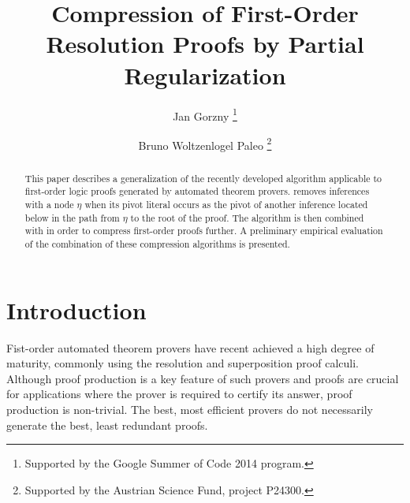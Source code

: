 \documentclass{llncs}
\title{Compression of First-Order Resolution Proofs by Partial Regularization} %
\author{
  Jan Gorzny\inst{1}
  \thanks{Supported by the Google Summer of Code 2014 program.}
  \and 
  Bruno Woltzenlogel Paleo\inst{2}
  \thanks{Supported by the Austrian Science Fund, project P24300.}
}
\institute{
  \email{jgorzny@uvic.ca}, University of Victoria, Canada
  \and 
  \email{bruno@logic.at}, Vienna University of Technology, Austria
}
\begin{document}
\maketitle


\begin{abstract}%
This paper describes a generalization of the recently developed \RecyclePivotsIntersection algorithm applicable to first-order logic proofs generated by automated theorem provers. \RecyclePivotsIntersection removes inferences with a node $\eta$ when its pivot literal occurs as the pivot of another inference located below in the path from $\eta$ to the root of the proof. The algorithm is then combined with \SFOLowerUnits in order to compress first-order proofs further. A preliminary empirical evaluation of the combination of these compression algorithms is presented.
\end{abstract}


\setcounter{footnote}{0}

\section{Introduction}

Fist-order automated theorem provers have recent achieved a high degree of maturity, commonly using the resolution and superposition proof calculi. Although proof production is a key feature of such provers and proofs are crucial for applications where the prover is required to certify its answer, proof production is non-trivial. The best, most efficient provers do not necessarily generate the best, least redundant proofs.
\end{document}
